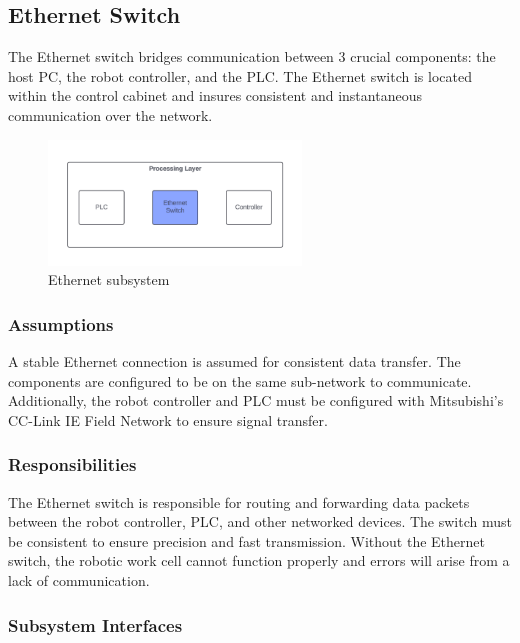 \subsection{Ethernet Switch}
The Ethernet switch bridges communication between 3 crucial components: the host PC, the robot controller, and the PLC. The Ethernet switch is located within the control cabinet and insures consistent and instantaneous communication over the network.
\begin{figure}[h!]
	\centering
 	\includegraphics[width=0.60\textwidth]{images/Processing_Ethernet.png}
 \caption{Ethernet subsystem}
\end{figure}

\subsubsection{Assumptions}
A stable Ethernet connection is assumed for consistent data transfer. The components are configured to be on the same sub-network to communicate. Additionally, the robot controller and PLC must be configured with Mitsubishi's CC-Link IE Field Network to ensure signal transfer.
\subsubsection{Responsibilities}
The Ethernet switch is responsible for routing and forwarding data packets between the robot controller, PLC, and other networked devices. The switch must be consistent to ensure precision and fast transmission. Without the Ethernet switch, the robotic work cell cannot function properly and errors will arise from a lack of communication.

\subsubsection{Subsystem Interfaces}

